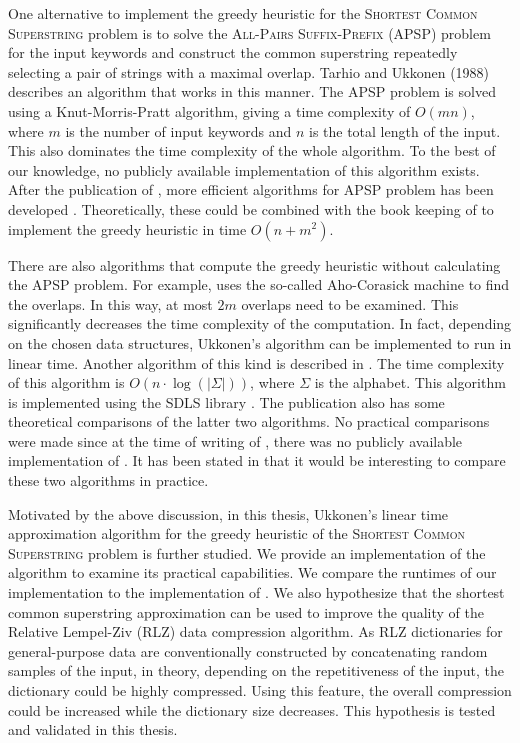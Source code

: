\documentclass[english,twoside,censored,csm,algorithms-track-2020]{HYthesisML}
\theoremstyle{plain}
\theoremstyle{definition}
\begin{document}
One alternative to implement the greedy heuristic for the \textsc{Shortest Common Superstring}
problem is to solve the 
\textsc{All-Pairs Suffix-Prefix} (APSP) problem \citep{Lim17} for the input keywords and construct the
common superstring repeatedly selecting a pair of strings with a maximal overlap.
Tarhio and Ukkonen (1988) describes an algorithm that works in this manner. The APSP problem is solved
using a Knut-Morris-Pratt algorithm, giving a time complexity of $O(mn)$, where $m$ is the
number of input keywords and $n$ is the total length of the input. This also dominates the time
complexity of the whole algorithm. To the best of our knowledge, no publicly available
implementation of this algorithm exists. After the publication of \citep{Tarhio88}, more efficient
algorithms for APSP problem has been developed \citep{Gusfield92}. Theoretically, these could be
combined with the book keeping of \citep{Tarhio88} to implement the greedy heuristic in time
$O(n+m^2)$.

There are also algorithms that compute the greedy heuristic without calculating the APSP problem.
For example, \citep{Ukkonen90} uses the so-called Aho-Corasick machine to find the overlaps. In this way,
at most $2m$ overlaps need to be examined. This significantly decreases the time complexity of
the computation. In fact, depending on the chosen data structures, Ukkonen's algorithm can be implemented
to run in linear time.
Another algorithm of this kind is described in \citep{Alanko17}.
The time complexity of this
algorithm is $O(n\cdot\log(|\Sigma|))$, where $\Sigma$ is the alphabet.
This algorithm is implemented using the SDLS library  \citep{SDLS}. The publication also has some
theoretical comparisons of the latter two algorithms. No practical comparisons were made since at the
time of writing of \citep{Alanko17}, there was no publicly available implementation of
\citep{Ukkonen90}. It has been stated in \citep{Alanko17} that
it would be interesting to compare these two algorithms in practice.

Motivated by the above discussion, in this thesis, Ukkonen's linear time approximation algorithm
for the greedy heuristic of the \textsc{Shortest Common Superstring} problem is further studied.
We provide an implementation of the algorithm to examine its practical capabilities.
We compare the runtimes of our implementation to the implementation of \citep{Alanko17}.
We also hypothesize that the shortest common superstring approximation can be used to
improve the quality of the Relative Lempel-Ziv (RLZ) data compression algorithm. As RLZ dictionaries
for general-purpose data are conventionally
constructed by concatenating random samples of the input, in theory,
depending on the repetitiveness of the input, the dictionary could be highly compressed.
Using this feature, the overall compression could be increased while the dictionary size
decreases. This hypothesis is tested and validated in this thesis. 
\end{document}
